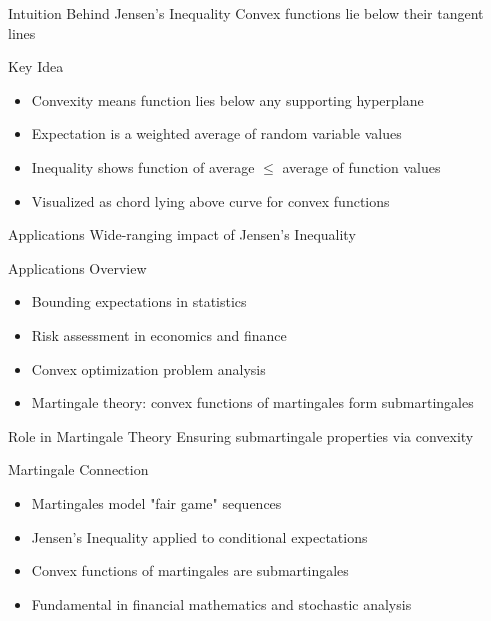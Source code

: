 \documentclass{beamer}
\begin{document}
\begin{frame}{Intuition Behind Jensen's Inequality}
Convex functions lie below their tangent lines

\begin{block}{Key Idea}
\begin{itemize}
\item Convexity means function lies below any supporting hyperplane
\item Expectation is a weighted average of random variable values
\item Inequality shows function of average \( \leq \) average of function values
\item Visualized as chord lying above curve for convex functions
\end{itemize}
\end{block}
\end{frame}

\begin{frame}{Applications}
Wide-ranging impact of Jensen's Inequality

\begin{block}{Applications Overview}
\begin{itemize}
\item Bounding expectations in statistics
\item Risk assessment in economics and finance
\item Convex optimization problem analysis
\item Martingale theory: convex functions of martingales form submartingales
\end{itemize}
\end{block}
\end{frame}

\begin{frame}{Role in Martingale Theory}
Ensuring submartingale properties via convexity

\begin{block}{Martingale Connection}
\begin{itemize}
\item Martingales model "fair game" sequences
\item Jensen's Inequality applied to conditional expectations
\item Convex functions of martingales are submartingales
\item Fundamental in financial mathematics and stochastic analysis
\end{itemize}
\end{block}
\end{frame}
\end{document}
